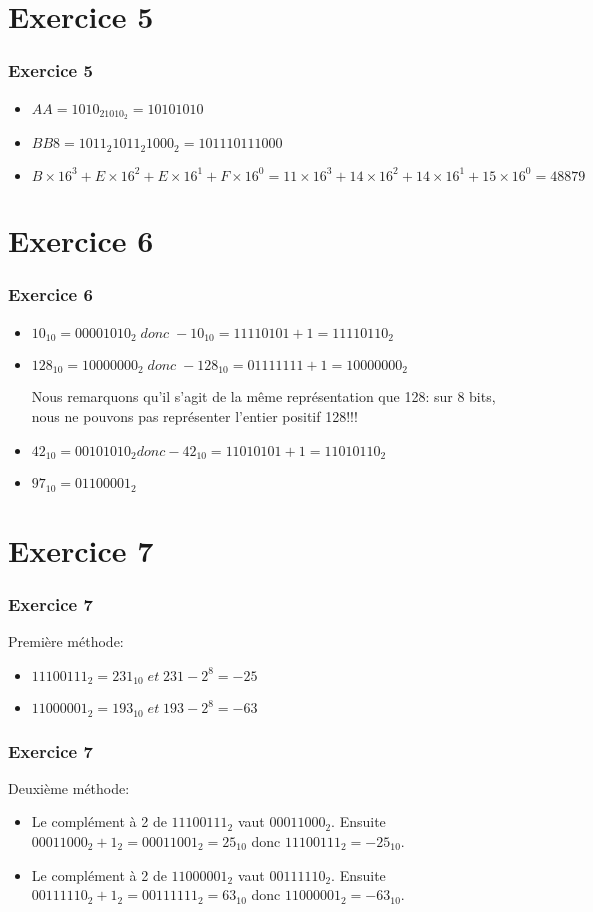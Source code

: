 \documentclass[svgnames,11pt]{beamer}
\begin{document}
\section{Exercice 5}
\begin{frame}
    \frametitle{Exercice 5}


    \begin{itemize}
        \item $AA=1010_21010_2=10101010$
        \item $BB8=1011_2 1011_2 1000_2=101110111000$
        \item $B×16^3+E×16^2+E×16^1+F×16^0=11×16^3+14×16^2+14×16^1+15×16^0=48879$
    \end{itemize}
\end{frame}
\section{Exercice 6}
\begin{frame}
    \frametitle{Exercice 6}

    \begin{itemize}
        \item $10_{10}=00001010_2\;donc\;-10_{10}=11110101+1=11110110_2$
        \item $128_{10}=10000000_2\;donc\;-128_{10}=01111111+1=10000000_2$
              \begin{aretenir}[Remarque]
                  Nous remarquons qu'il s'agit de la même représentation que 128: sur 8 bits, nous ne pouvons pas représenter l'entier positif 128!!!
              \end{aretenir}
        \item $42_{10}=00101010_2 donc -42_{10}=11010101+1=11010110_2$
        \item $97_{10}=01100001_2$
    \end{itemize}

\end{frame}
\section{Exercice 7}
\begin{frame}
    \frametitle{Exercice 7}
    Première méthode:
    \begin{itemize}
        \item  $11100111_2=231_{10}\;et\;231-2^8=-25$
        \item  $11000001_2=193_{10}\;et\;193-2^8=-63$
    \end{itemize}

\end{frame}
\begin{frame}
    \frametitle{Exercice 7}
    Deuxième méthode:
    \begin{itemize}
        \item Le complément à 2 de $11100111_2$ vaut $00011000_2$. Ensuite $00011000_2+1_2=00011001_2=25_{10}$ donc $11100111_2=-25_{10}$.
        \item Le complément à 2 de $11000001_2$ vaut $00111110_2$. Ensuite $00111110_2+1_2=00111111_2=63_{10}$ donc $11000001_2=-63_{10}$.
    \end{itemize}

\end{frame}
\end{document}
